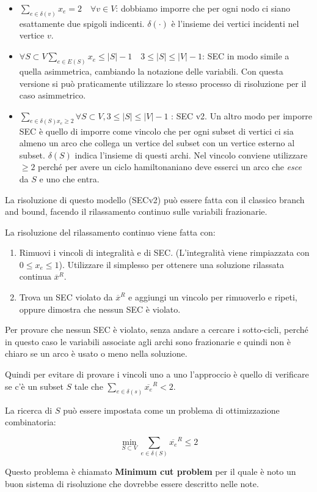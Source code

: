 \begin{itemize}
	\item $\sum_{e \in \delta(v)} x_e = 2 \quad \forall v \in V$: dobbiamo imporre che per ogni nodo ci siano esattamente due spigoli indicenti. $\delta(\cdot)$ è l'insieme dei vertici incidenti nel vertice $v$.
	\item $ \forall S \subset V \sum_{e \in E(S)} x_e \leq |S|-1 \quad 3 \leq |S| \leq |V|-1$: SEC in modo simile a quella asimmetrica, cambiando la notazione delle variabili. Con questa versione si può praticamente utilizzare lo stesso processo di risoluzione per il caso asimmetrico.\\
	\item $ \sum_{e \in \delta(S) x_e \geq 2} \forall S \subset V, 3 \leq |S| \leq |V|-1  $ : SEC v2. Un altro modo per imporre SEC è quello di imporre come vincolo che per ogni subset di vertici ci sia almeno un arco che collega un vertice del subset con un vertice esterno al subset. $\delta(S)$ indica l'insieme di questi archi. Nel vincolo conviene utilizzare $\geq2$ perché per avere un ciclo hamiltonaniano deve esserci un arco che \textit{esce} da $S$ e uno che entra.
\end{itemize} 

La risoluzione di questo modello (SECv2) può essere fatta con il classico branch and bound, facendo il rilassamento continuo sulle variabili frazionarie.

La risoluzione del rilassamento continuo viene fatta con:

\begin{enumerate}
	\item Rimuovi i vincoli di integralità e di SEC. (L'integralità viene rimpiazzata con $0 \leq x_e \leq 1$). Utilizzare il simplesso per ottenere una soluzione rilassata continua $\overline{x}^R$.
	\item Trova un SEC violato da $\overline{x}^R$ e aggiungi un vincolo per rimuoverlo e ripeti, oppure dimostra che nessun SEC è violato.
\end{enumerate}

Per provare che nessun SEC è violato, senza andare a cercare i sotto-cicli, perché in questo caso le variabili associate agli archi sono frazionarie e quindi non è chiaro se un arco è usato o meno nella soluzione.

Quindi per evitare di provare i vincoli uno a uno l'approccio è quello di verificare se c'è un subset $S$ tale che $\sum_{e \in \delta(s)} \overline{x_e}^R < 2$.

La ricerca di $S$ può essere impostata come un problema di ottimizzazione combinatoria:

$$
\min_{S \subset V} \sum_{e \in \delta(S)} \overline{x_e}^R  \leq 2
$$

Questo problema è chiamato \textbf{Minimum cut problem} per il quale è noto un buon sistema di risoluzione che dovrebbe essere descritto nelle note.








